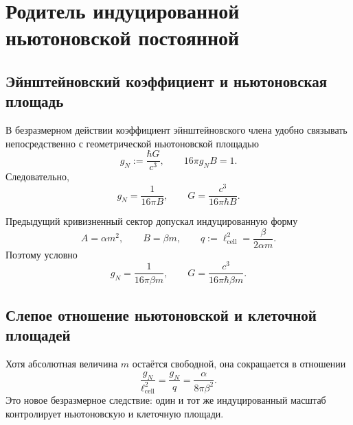 \chapter{Родитель индуцированной ньютоновской постоянной}
\label{ch:v10-induced-newton-parent}

\section{Эйнштейновский коэффициент и ньютоновская площадь}

В безразмерном действии коэффициент эйнштейновского члена удобно связывать
непосредственно с геометрической ньютоновской площадью
\begin{equation}
 g_N:=\frac{\hbar G}{c^3},
 \qquad 16\pi g_N B=1.
 \label{eq:v10-newton-einstein-normalization}
\end{equation}
Следовательно,
\begin{equation}
 g_N=\frac1{16\pi B},
 \qquad
 G=\frac{c^3}{16\pi\hbar B}.
 \label{eq:v10-newton-from-B}
\end{equation}

Предыдущий кривизненный сектор допускал индуцированную форму
\begin{equation}
 A=\alpha m^2,
 \qquad B=\beta m,
 \qquad
 q:=\ell_{\mathrm{cell}}^2=\frac{\beta}{2\alpha m}.
 \label{eq:v10-newton-induced-data}
\end{equation}
Поэтому условно
\begin{equation}
 g_N=\frac1{16\pi\beta m},
 \qquad
 G=\frac{c^3}{16\pi\hbar\beta m}.
 \label{eq:v10-newton-induced-constant}
\end{equation}

\section{Слепое отношение ньютоновской и клеточной площадей}

Хотя абсолютная величина $m$ остаётся свободной, она сокращается в отношении
\begin{equation}
 \boxed{\frac{g_N}{\ell_{\mathrm{cell}}^2}
 =\frac{g_N}{q}
 =\frac{\alpha}{8\pi\beta^2}}.
 \label{eq:v10-newton-cell-blind-ratio}
\end{equation}
Это новое безразмерное следствие: один и тот же индуцированный масштаб
контролирует ньютоновскую и клеточную площади.


